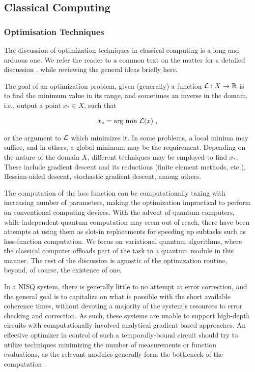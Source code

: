 
\subsection{Classical Computing}

\subsubsection{Optimisation Techniques}
The discussion of optimization techniques in classical computing is a long and
arduous one. We refer the reader to a common text on the matter for a detailed
discussion \cite{boyd2004convex,nocedal2006numerical}, while reviewing the
general ideas briefly here.

The goal of an optimization problem, given (generally) a function
\(\mathcal{L}:X\to\mathbb{R}\) is to find the minimum value in its range, and sometimes an
inverse in the domain, i.e., output a point \(x_* \in X\), such that

\begin{gather*}
    x_* = \text{arg min } \mathcal{L}(x)~,
\end{gather*}

or the argument to \(\mathcal{L}\) which minimizes it. In some problems, a local
minima may suffice, and in others, a global minimum may be the requirement.
Depending on the nature of the domain \(X\), different techniques may be
employed to find \(x_*\). These include gradient descent and its reductions
(finite element methods, etc.), Hessian-aided descent,  stochastic gradient
descent, among others.

The computation of the loss function can be computationally taxing with
increasing number of parameters, making the optimization impractical to perform
on conventional computing devices. With the advent of quantum computers, while
independent quantum computation may seem out of reach, there have been attempts
at using them as slot-in replacements for speeding up subtasks such as
loss-function computation. We focus on variational quantum algorithms, where the
classical computer offloads part of the task to a quantum module in this manner.
%
The rest of the discussion is agnostic of the
optimization routine, beyond, of course, the existence of one.

In a NISQ system, there is generally little to no attempt at error correction,
and the general goal is to capitalize on what is possible with the short
available coherence times, without devoting a majority of the system's resources
to error checking and correction. As such, these systems are unable to support
high-depth circuits with computationally involved analytical gradient based
approaches. An effective optimizer in control of such a temporally-bound circuit
should try to utilize techniques minimizing the number of measurements or
function evaluations, as the relevant modules generally form the bottleneck of
the computation \cite[see][chapter II.D]{bharti2021noisy}.

